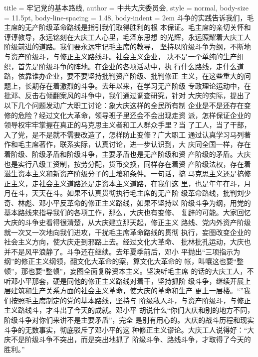 \begin{hongqiarticle}{
        title  = {牢记党的基本路线},
        author = {中共大庆委员会},
        style  = normal,
        body-size = 11.5pt,
        body-line-spacing = 1.48,
        body-indent = 2em
    }
    斗争的实践告诉我们，毛主席的无产阶级革命路线是指引我们取得胜利的根
    本保证。毛主席的亲切关怀和谆谆教导，永远铭刻在大庆工人心里，毛泽东思想
    的光辉，永远照耀着大庆工人阶级前进的道路。我们要永远牢记毛主席的教导，
    坚持以阶级斗争为纲，不断地与资产阶级斗，与修正主义路线斗。社会主义企业，
    决不是一个单纯的生产组织，首先是阶级斗争的阵地。在企业的各项活动中，执
    行什么路线，走什么道路，依靠谁办企业，要不要坚持批判资产阶级、批判修正
    主义，在这些重大的问题上，长期存在着激烈的斗争。去年以来，在学习无产阶级
    专政理论运动中，在批邓、反击右倾翻案风的斗争中，我们通过调查研究，针对
    大庆的实际，提出了以下几个问题发动广大职工讨论：象大庆这样的全民所有制
    企业是不是还存在变修的危险？经过文化大革命，领导班子里还会不会出现走资
    派，怎样保证企业的领导权牢牢掌握在真正的马克思主义者和工人群众手里？当
    了工人，当了干部，入了党，是不是就不需要改造了，怎样防止变修？广大职工
    通过认真学习马列著作和毛主席著作，联系实际，认真讨论，进一步认识到，大
    庆同全国一样，存在着阶级、阶级矛盾和阶级斗争，主要矛盾也是无产阶级和资
    产阶级的矛盾。大庆也是实行八级工资制，按劳分配，货币交换，同样存在着资
    产阶级法权，存在着滋生资本主义和新资产阶级分子的土壤和条件。一句话，搞
    马克思主义还是搞修正主义，走社会主义道路还是走资本主义道路，在我们这
    里，也是年年在斗，月月在斗，天天在斗。如果不认真贯彻执行毛主席的无产阶
    级革命路线，批判刘少奇、林彪、邓小平反革命的修正主义路线，如果不坚持以
    阶级斗争为纲，用党的基本路线来指导我们的各项工作，那么，大庆也有变修、
    复辟的可能。大家回忆大庆的斗争史看得很清楚，从大庆建立那天起，修正主义
    路线、党内外资产阶级就一次又一次地向我们进攻，干扰毛主席革命路线的贯彻
    执行，妄图改变企业的社会主义方向，使大庆走到邪路上去。经过文化大革命、
    批林批孔运动，大庆也并不是风平浪静了。斗争还在继续。去年夏季前后，邓小
    平抛出“三项指示为纲”的修正主义纲领，翻文化大革命的案，算文化大革命的
    帐，叫嚷这也要“整顿”，那也要“整顿”，妄图全面复辟资本主义。坚决听毛主席
    的话的大庆工人，不听邓小平那套，硬是同他的修正主义路线对着干，坚持抓阶
    级斗争，继续开展上层建筑和生产关系方面的社会主义革命，使大庆的革命和生产
    更上一层楼。“”我们按照毛主席制定的党的基本路线，坚持与
    阶级敌人斗，与资产阶级斗，与修正主义路线斗，才斗出了今天的成就。邓小平
    胡说什么“你们大庆和别的地方不同，阶级斗争对你们来讲不是主要矛盾”，完全
    是别有用心的。大庆的战斗历程和现实斗争的无数事实，彻底驳斥了邓小平的这
    种修正主义谬论。大庆工人说得好：“大庆不是阶级斗争不突出，而是突出地抓了
    阶级斗争、路线斗争，才取得了今天的胜利。”
    

\end{hongqiarticle}
